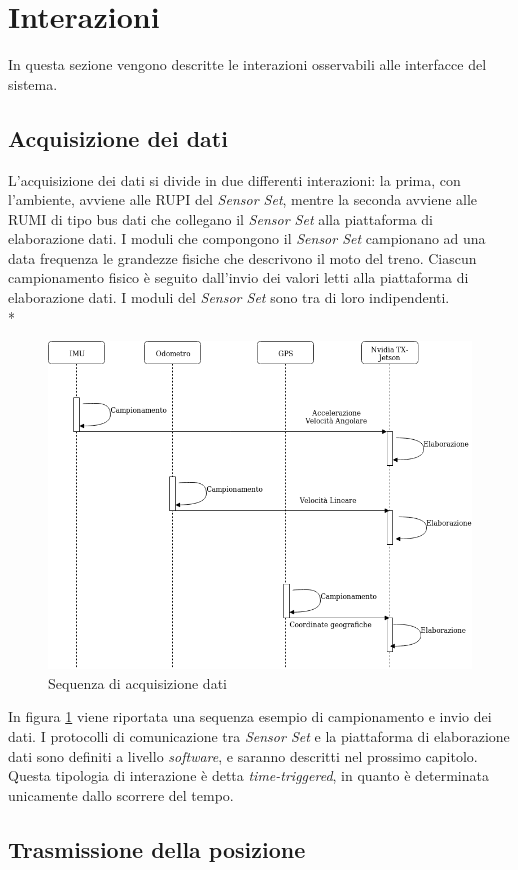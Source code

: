 	\section{Interazioni}
	In questa sezione vengono descritte le interazioni osservabili alle interfacce del sistema.
	\subsection{Acquisizione dei dati}
	L'acquisizione dei dati si divide in due differenti interazioni: la prima, con l'ambiente, avviene alle RUPI del \emph{Sensor Set}, mentre la seconda avviene alle RUMI di tipo bus dati che collegano il \emph{Sensor Set} alla piattaforma di elaborazione dati.
	I moduli che compongono il \emph{Sensor Set} campionano ad una data frequenza le grandezze fisiche che descrivono il moto del treno. Ciascun campionamento fisico \`e seguito dall'invio dei valori letti alla piattaforma di elaborazione dati. I moduli del \emph{Sensor Set} sono tra di loro indipendenti.\\* 
	\begin{figure}[h]
		\centering
		\includegraphics[width=0.7\linewidth]{img/seqdiag}
		\caption{Sequenza di acquisizione dati}
		\label{fig:seqdiag}
	\end{figure}
\clearpage
	In figura \ref{fig:seqdiag} viene riportata una sequenza esempio di campionamento e invio dei dati. I protocolli di comunicazione tra \emph{Sensor Set} e la piattaforma di elaborazione dati sono definiti a livello \emph{software}, e saranno descritti nel prossimo capitolo.
	Questa tipologia di interazione \`e detta \emph{time-triggered}, in quanto \`e determinata unicamente dallo scorrere del tempo. \cite{timetriggered} \cite{evttimetriggered}
	\subsection{Trasmissione della posizione}
	
